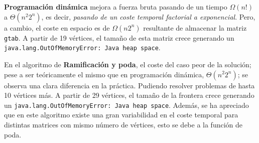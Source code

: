 \documentclass{article}
\begin{document}
    \textbf{Programación dinámica} mejora a fuerza bruta pasando de un tiempo $\Omega (n!)$
    a $\Theta (n^2 2^n)$, es decir, \emph{pasando de un coste temporal
    factorial a exponencial}. Pero, a cambio, el coste en espacio es de $\Omega (n 2^n)$
    resultante de almacenar la matriz \texttt{gtab}. A partir de 19 vértices,
    el tamaño de esta matriz crece generando un \texttt{java.lang.OutOfMemoryError: Java heap space}.


    En el algoritmo de \textbf{Ramificación y poda}, el coste del caso peor de la solución;
    pese a ser teóricamente el mismo que en programación dinámica, $\Theta (n^2 2^n)$;
    se observa una clara diferencia en la práctica. Pudiendo resolver problemas de hasta
    10 vértices más. A partir de 29 vértices, el tamaño de la frontera crece
    generando un \texttt{java.lang.OutOfMemoryError: Java heap space}.
    Además, se ha apreciado que en este algoritmo existe una
    gran variabilidad en el coste temporal para distintas matrices con mismo
    número de vértices, esto se debe a la función de poda.



\end{document}
